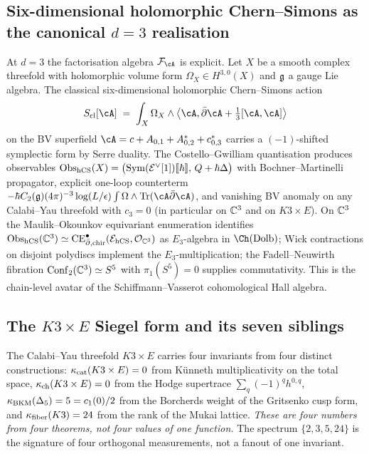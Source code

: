 \subsection*{Six-dimensional holomorphic Chern--Simons as the
canonical $d{=}3$ realisation}
\label{wn:sec:platonic-preface-6d-hCS-wn}

At $d = 3$ the factorisation algebra $\cF_\cA$ is explicit. Let $X$
be a smooth complex threefold with holomorphic volume form
$\Omega_X \in H^{3,0}(X)$ and $\mathfrak{g}$ a gauge Lie algebra. The classical
six-dimensional holomorphic Chern--Simons action
\[
S_{\mathrm{cl}}[\cA] \;=\; \int_X \Omega_X \wedge
\bigl\langle \cA, \bar\partial \cA + \tfrac{1}{3}[\cA, \cA] \bigr\rangle
\]
on the BV superfield $\cA = c + A_{0,1} + A^{*}_{0,2} + c^{*}_{0,3}$
carries a $(-1)$-shifted symplectic form by Serre duality. The
Costello--Gwilliam quantisation produces observables
$\mathrm{Obs}_{\mathrm{hCS}}(X) = \bigl(\mathrm{Sym}(\mathcal{E}^\vee[1])[\![\hbar]\!],\,
Q + \hbar \Delta\bigr)$ with Bochner--Martinelli propagator, explicit
one-loop counterterm $-\hbar C_2(\fg)(4\pi)^{-3} \log(L/\epsilon)
\int \Omega \wedge \mathrm{Tr}(\cA \bar\partial \cA)$, and vanishing
BV anomaly on any Calabi--Yau threefold with $c_3 = 0$
(in particular on $\mathbb{C}^3$ and on $K3 \times E$). On $\mathbb{C}^3$ the
Maulik--Okounkov equivariant enumeration identifies
$\mathrm{Obs}_{\mathrm{hCS}}(\mathbb{C}^3) \simeq \mathrm{CE}^{\bullet}_{\bar\partial, \mathrm{chir}}
(\mathcal{E}_{\mathrm{hCS}}, \mathcal{O}_{\mathbb{C}^3})$ as $E_3$-algebra in $\Ch(\mathrm{Dolb})$;
Wick contractions on disjoint polydiscs implement the
$E_3$-multiplication; the Fadell--Neuwirth fibration
$\mathrm{Conf}_2(\mathbb{C}^3) \simeq S^5$ with $\pi_1(S^5) = 0$ supplies
commutativity. This is the chain-level avatar of the
Schiffmann--Vasserot cohomological Hall algebra.

\subsection*{The $K3 \times E$ Siegel form and its seven siblings}
\label{wn:sec:platonic-preface-K3E-Siegel-wn}

The Calabi--Yau threefold $K3 \times E$ carries four invariants from
four distinct constructions:
$\kappa_{\mathrm{cat}}(K3 \times E) = 0$ from K\"unneth multiplicativity on the total
space, $\kappa_{\mathrm{ch}}(K3 \times E) = 0$ from the Hodge supertrace
$\sum_q (-1)^q h^{0,q}$, $\kappa_{\mathrm{BKM}}(\Delta_5) = 5 = c_1(0)/2$ from the
Borcherds weight of the Gritsenko cusp form, and $\kappa_{\mathrm{fiber}}(K3) = 24$
from the rank of the Mukai lattice.
\emph{These are four numbers from four theorems, not four values of
one function.} The spectrum $\{2, 3, 5, 24\}$ is the signature of
four orthogonal measurements, not a fanout of one invariant.

